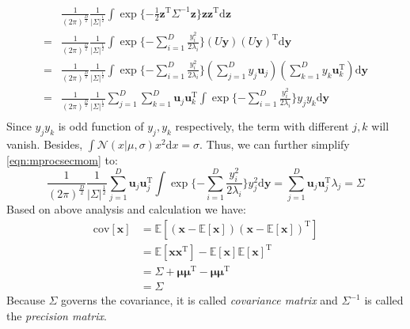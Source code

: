 \begin{equation}
\begin{split}
&\frac{1}{(2\pi)^{\frac{D}{2}}}\frac{1}{\vert{}\Sigma\vert^{\frac{1}{2}}}\int{}\exp{}\{-\frac{1}{2}\mathbf{z}^{\mathrm{T}}\Sigma^{-1}\mathbf{z}\}\mathbf{z}\mathbf{z}^{\mathrm{T}}\text{d}\mathbf{z}\\
=&\frac{1}{(2\pi)^{\frac{D}{2}}}\frac{1}{\vert{}\Sigma\vert^{\frac{1}{2}}}\int{}\exp{}\{-\sum_{i=1}^{D}\frac{y_{i}^2}{2\lambda_{i}}\}(U\mathbf{y})(U\mathbf{y})^{\mathrm{T}}\text{d}\mathbf{y}\\
=&\frac{1}{(2\pi)^{\frac{D}{2}}}\frac{1}{\vert{}\Sigma\vert^{\frac{1}{2}}}\int{}\exp{}\{-\sum_{i=1}^{D}\frac{y_{i}^2}{2\lambda_{i}}\}(\sum_{j=1}^{D}y_{j}\mathbf{u}_{j})(\sum_{k=1}^{D}y_{k}\mathbf{u}_{k}^{\mathrm{T}})\text{d}\mathbf{y}\\
=&\frac{1}{(2\pi)^{\frac{D}{2}}}\frac{1}{\vert{}\Sigma\vert^{\frac{1}{2}}}\sum_{j=1}^{D}\sum_{k=1}^{D}\mathbf{u}_{j}\mathbf{u}_{k}^{\mathrm{T}}\int{}\exp{}\{-\sum_{i=1}^{D}\frac{y_{i}^2}{2\lambda_{i}}\}y_{j}y_{k}\text{d}\mathbf{y}\\
\end{split}
\label{eqn:mprocsecmom}
\end{equation}
Since $y_{j}y_{k}$ is odd function of $y_{j},y_{k}$ respectively, the
term with different $j,k$ will vanish. Besides,
     $\int{}\mathcal{N}(x\vert{}\mu,\sigma)x^{2}\text{d}x=\sigma$.
     Thus, we can further simplify \eqref{eqn:mprocsecmom} to:
\begin{equation}
\frac{1}{(2\pi)^{\frac{D}{2}}}\frac{1}{\vert{}\Sigma\vert^{\frac{1}{2}}}\sum_{j=1}^{D}\mathbf{u}_{j}\mathbf{u}_{j}^{\mathrm{T}}\int{}\exp{}\{-\sum_{i=1}^{D}\frac{y_{i}^2}{2\lambda_{i}}\}y_{j}^{2}\text{d}\mathbf{y}=\sum_{j=1}^{D}\mathbf{u}_{j}\mathbf{u}_{j}^{\mathrm{T}}\lambda_{j}=\Sigma
\label{eqn:gaussiansecmm}
\end{equation}
Based on above analysis and calculation we have:
\begin{equation}
\begin{split}
\text{cov}[\mathbf{x}]&=\mathbb{E}[(\mathbf{x}-\mathbb{E}[\mathbf{x}])(\mathbf{x}-\mathbb{E}[\mathbf{x}])^{\mathrm{T}}]\\
&=\mathbb{E}[\mathbf{x}\mathbf{x}^{\mathrm{T}}]-\mathbb{E}[\mathbf{x}]\mathbb{E}[\mathbf{x}]^{\mathrm{T}}\\
&=\Sigma+\boldsymbol{\mu}\boldsymbol{\mu}^{\mathrm{T}}-\boldsymbol{\mu}\boldsymbol{\mu}^{\mathrm{T}}\\
&=\Sigma
\end{split}
\label{eqn:gaussiancov}
\end{equation}
Because $\Sigma$ governs the covariance, it is called \emph{covariance
    matrix} and $\Sigma^{-1}$ is called the \emph{precision matrix}.






